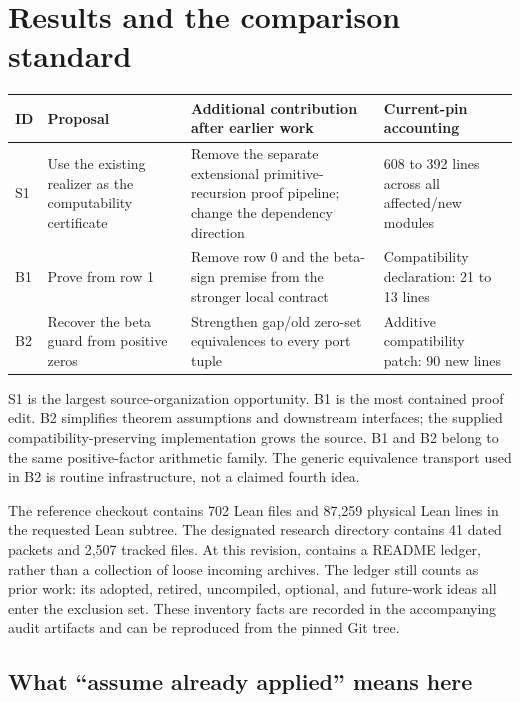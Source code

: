 \documentclass[10pt,a4paper]{article}
\newcommand{\code}[1]{\texttt{\detokenize{#1}}}
\begin{document}
\tableofcontents
\newpage

\section{Results and the comparison standard}

\begin{tabularx}{\linewidth}{@{}P{9mm}P{41mm}YP{32mm}@{}}
\toprule
ID & Proposal & Additional contribution after earlier work & Current-pin accounting\\
\midrule
S1 & Use the existing realizer as the computability certificate & Remove the separate extensional primitive-recursion proof pipeline; change the dependency direction & 608 to 392 lines across all affected/new modules\\
B1 & Prove \code{source_Y_ge_two} from row 1 & Remove row 0 and the beta-sign premise from the stronger local contract & Compatibility declaration: 21 to 13 lines\\
B2 & Recover the beta guard from positive zeros & Strengthen gap/old zero-set equivalences to every port tuple & Additive compatibility patch: 90 new lines\\
\bottomrule
\end{tabularx}

S1 is the largest source-organization opportunity. B1 is the most contained proof edit. B2 simplifies theorem assumptions and downstream interfaces; the supplied compatibility-preserving implementation grows the source. B1 and B2 belong to the same positive-factor arithmetic family. The generic equivalence transport used in B2 is routine infrastructure, not a claimed fourth idea.

The reference checkout contains 702 Lean files and 87,259 physical Lean lines in the requested Lean subtree. The designated research directory contains 41 dated packets and 2,507 tracked files. At this revision, \code{docs/incoming} contains a README ledger, rather than a collection of loose incoming archives. The ledger still counts as prior work: its adopted, retired, uncompiled, optional, and future-work ideas all enter the exclusion set. These inventory facts are recorded in the accompanying audit artifacts and can be reproduced from the pinned Git tree.\cite{sourcepin,research,incoming}

\subsection{What ``assume already applied'' means here}
\end{document}
